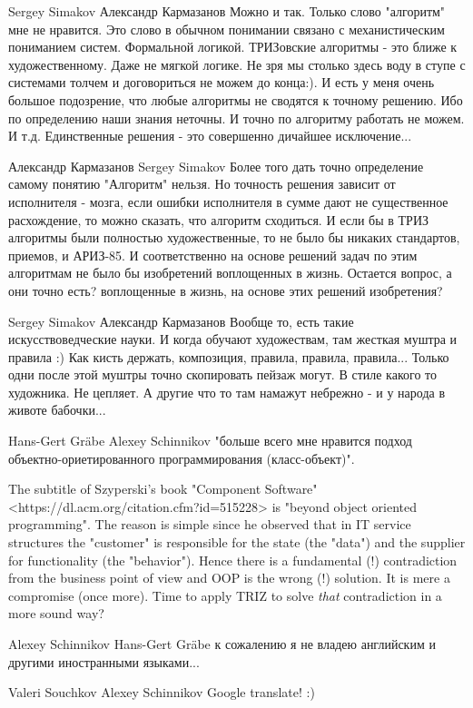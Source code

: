 \documentclass[11pt,a4paper]{article}
\begin{document}
Sergey Simakov Александр Кармазанов Можно и так. Только слово "алгоритм" мне
не нравится. Это слово в обычном понимании связано с механистическим
пониманием систем. Формальной логикой.  ТРИЗовские алгоритмы - это ближе к
художественному. Даже не мягкой логике. Не зря мы столько здесь воду в ступе с
системами толчем и договориться не можем до конца:).  И есть у меня очень
большое подозрение, что любые алгоритмы не сводятся к точному решению. Ибо по
определению наши знания неточны. И точно по алгоритму работать не можем. И
т.д.  Единственные решения - это совершенно дичайшее исключение...

Александр Кармазанов Sergey Simakov Более того дать точно определение самому
понятию "Алгоритм" нельзя. Но точность решения зависит от исполнителя - мозга,
если ошибки исполнителя в сумме дают не существенное расхождение, то можно
сказать, что алгоритм сходиться. И если бы в ТРИЗ алгоритмы были полностью
художественные, то не было бы никаких стандартов, приемов, и АРИЗ-85. И
соответственно на основе решений задач по этим алгоритмам не было бы
изобретений воплощенных в жизнь. Остается вопрос, а они точно есть?
воплощенные в жизнь, на основе этих решений изобретения?

Sergey Simakov Александр Кармазанов Вообще то, есть такие искусствоведческие
науки. И когда обучают художествам, там жесткая муштра и правила :) Как кисть
держать, композиция, правила, правила, правила...  Только одни после этой
муштры точно скопировать пейзаж могут. В стиле какого то художника. Не
цепляет.  А другие что то там намажут небрежно - и у народа в животе
бабочки...

Hans-Gert Gräbe Alexey Schinnikov "больше всего мне нравится подход
объектно-ориетированного программирования (класс-объект)".

The subtitle of Szyperski's book "Component Software"
<https://dl.acm.org/citation.cfm?id=515228> is "beyond object oriented
programming". The reason is simple since he observed that in IT service
structures the "customer" is responsible for the state (the "data") and the
supplier for functionality (the "behavior"). Hence there is a fundamental (!)
contradiction from the business point of view and OOP is the wrong (!)
solution. It is mere a compromise (once more). Time to apply TRIZ to solve
\emph{that} contradiction in a more sound way?

Alexey Schinnikov Hans-Gert Gräbe к сожалению я не владею английским и другими
иностранными языками...

Valeri Souchkov Alexey Schinnikov Google translate! :)
\end{document}
